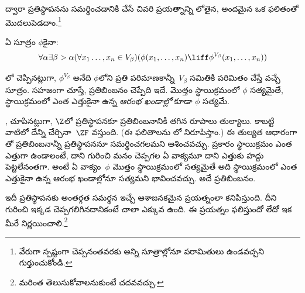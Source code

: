\documentclass[../../../include/open-logic-section]{subfiles}
\begin{document}

\stagesinex{} ద్వారా ప్రతిస్థాపనను సమర్థించడానికి చేసే
చివరి ప్రయత్నాన్ని లోతైన, అందమైన ఒక ఫలితంతో మొదలుపెడదాం.\footnote{వేరుగా
స్పష్టంగా చెప్పనంతవరకు అన్ని సూత్రాల్లోనూ పరామితులు ఉండవచ్చని గుర్తుంచుకోండి.}
\begin{thm}[ప్రతిబింబన పథకం]
ఏ సూత్రం $\phi$కైనా:
\[
\forall \alpha \exists \beta > \alpha (\forall x_1 \ldots, x_n \in
V_\beta)(\phi(x_1, \ldots, x_n) \liff \phi^{V_\beta}(x_1, \ldots, x_n))
\]
\end{thm}
\noindent
{}లో
చెప్పినట్లుగా, $\phi^{V_\beta}$ అనేది $\phi$లోని ప్రతి
పరిమాణకాన్నీ~$V_\beta$ సమితికి పరిమితం చేస్తే వచ్చే
సూత్రం. సహజంగా చూస్తే, ప్రతిబింబనం చెప్పేది ఇదే. మొత్తం
స్థాయిక్రమంలో $\phi$ సత్యమైతే, స్థాయిక్రమంలో ఎంత ఎత్తుకైనా ఉన్న
\emph{ఆరంభ ఖండాల్లో} కూడా $\phi$ సత్యమే.

\citet{Montague1961}, \citet{Levy1960} చూపినట్లుగా,
$\Z$లో ప్రతిస్థాపనకూ ప్రతిబింబనానికీ తగిన రూపాలు తుల్యాలు.
కాబట్టి వాటిలో దేన్ని చేర్చినా~$\ZF$ వస్తుంది. (ఈ ఫలితాలను
లో నిరూపిస్తాం.)
ఈ తుల్యత ఆధారంగా \stagesinex{}తో ప్రతిబింబనాన్నీ
ప్రతిస్థాపననూ సమర్థించగలమని ఆశించవచ్చు. \stagesinex{}
ప్రకారం స్థాయిక్రమం ఎంత ఎత్తుగా ఉండాలంటే, దాని గురించి
మనం చెప్పగల ఏ వాక్యమూ దాని ఎత్తుకు హద్దు పెట్టలేనంతగా.
అంటే ఏ వాక్యం~$\phi$ మొత్తం స్థాయిక్రమంలో సత్యమైతే అది
స్థాయిక్రమంలో ఎంత ఎత్తుకైనా ఉన్న ఆరంభ ఖండాల్లోనూ సత్యమని
భావించవచ్చు. అదే ప్రతిబింబనం.

ఇదీ ప్రతిస్థాపనకు అంతర్గత సమర్థన ఇచ్చే ఆశాజనకమైన
ప్రయత్నంలా కనిపిస్తుంది. దీని గురించి ఇక్కడ చెప్పగలిగినదానికంటే
చాలా ఎక్కువ ఉంది. ఈ ప్రయత్నం ఫలిస్తుందో లేదో ఇక మీరే
నిర్ణయించాలి.\footnote{మరింత తెలుసుకోవాలనుకుంటే \citet[95--100]{Incurvati2020}
చదవవచ్చు.}
\end{document}
